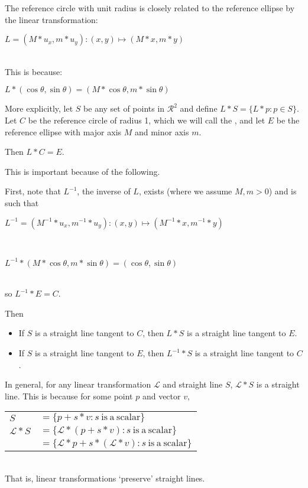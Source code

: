 \documentclass[12pt]{article}
\begin{document}
\medskip

The reference circle with unit radius is closely related to
the reference ellipse by the linear transformation: \\
\centerline{$L = (M*u_x,m*u_y): (x,y) \longmapsto (M*x,m*y)$} \\
This is because: \\
\centerline{$L*(\cos\theta,\sin\theta) = (M*\cos\theta,m*\sin\theta)$}

More explicitly, let $S$ be any set of points in ${\mathcal R}^2$
and define $L * S = \{ L*p: p \in S \}$.
Let $C$ be the reference circle of radius 1, which we will
call the , and let $E$ be the reference
ellipse with major axis $M$ and minor axis $m$.

Then $L*C = E$.

This is important because of the following.

First, note that $L^{-1}$, the inverse of $L$, exists (where we assume
$M,m>0$) and is such that \\
\centerline{$L^{-1} = (M^{-1}*u_x,m^{-1}*u_y): (x,y)
            \longmapsto (M^{-1}*x,m^{-1}*y)$} \\
\centerline{$L^{-1}*(M*\cos\theta,m*\sin\theta) = (\cos\theta,\sin\theta)$} \\
so $L^{-1}*E=C$.

Then
\begin{itemize}
\item If $S$ is a straight line tangent to $C$, then $L*S$ is a straight
line tangent to $E$.
\item If $S$ is a straight line tangent to $E$, then $L^{-1}*S$ is a straight
line tangent to $C$.
\end{itemize}

In general, for any linear transformation $\mathcal{L}$ and straight line
$S$, $\mathcal{L}*S$ is a straight line.  This is because for some point
$p$ and vector $v$, \\
\hspace*{0.5in}\begin{tabular}{ll}
$S$ & $= \{ p+s*v : s~\mathrm{is~a~scalar}\}$ \\
$\mathcal{L}*S$
    & $= \{ \mathcal{L}*(p+s*v) : s~\mathrm{is~a~scalar}\}$ \\
    & $= \{ \mathcal{L}*p+s*(\mathcal{L}*v) : s~\mathrm{is~a~scalar}\}$ \\
\end{tabular} \\
That is, linear transformations `preserve' straight lines.
\end{document}
